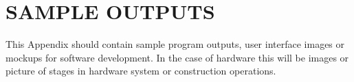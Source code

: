 \chapter{\large SAMPLE OUTPUTS}

This Appendix should contain sample program outputs, user interface images or mockups for software development. In the case of hardware this will be images or picture of stages in hardware system or construction operations.  
